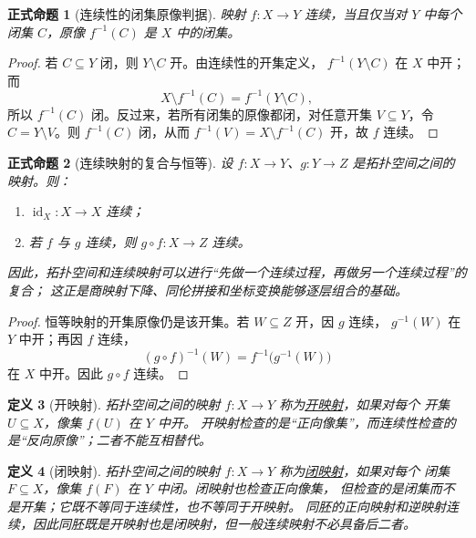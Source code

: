 \documentclass[UTF8,fontset=none,a4paper,11pt]{ctexart}
\theoremstyle{foundation-definition}
\newtheorem{definition}{定义}[section]
\theoremstyle{foundation-theorem}
\theoremstyle{foundation-proposition}
\newtheorem{proposition}[definition]{正式命题}
\theoremstyle{foundation-example}
\theoremstyle{foundation-remark}
\theoremstyle{foundation-theorem}
\newcommand{\term}[2]{\hyperref[#1]{#2}}
\begin{document}
\begin{proposition}[连续性的闭集原像判据]
\label{prop:continuous-closed-preimage}
映射 \(f:X\to Y\) 连续，当且仅当对 \(Y\) 中每个闭集 \(C\)，原像
\(f^{-1}(C)\) 是 \(X\) 中的闭集。
\end{proposition}

\begin{proof}
若 \(C\subseteq Y\) 闭，则 \(Y\setminus C\) 开。由连续性的开集定义，
\(f^{-1}(Y\setminus C)\) 在 \(X\) 中开；而
\[
X\setminus f^{-1}(C)=f^{-1}(Y\setminus C),
\]
所以 \(f^{-1}(C)\) 闭。反过来，若所有闭集的原像都闭，对任意开集
\(V\subseteq Y\)，令 \(C=Y\setminus V\)。则 \(f^{-1}(C)\) 闭，从而
\(f^{-1}(V)=X\setminus f^{-1}(C)\) 开，故 \(f\) 连续。
\end{proof}

\begin{proposition}[连续映射的复合与恒等]\label{prop:continuous-composition}
设 \(f:X\to Y\)、\(g:Y\to Z\) 是拓扑空间之间的映射。则：
\begin{enumerate}[label=(\alph*)]
  \item \(\operatorname{id}_X:X\to X\) 连续；
  \item 若 \(f\) 与 \(g\) 连续，则 \(g\circ f:X\to Z\) 连续。
\end{enumerate}
因此，拓扑空间和连续映射可以进行“先做一个连续过程，再做另一个连续过程”的复合；
这正是商映射下降、同伦拼接和坐标变换能够逐层组合的基础。
\end{proposition}

\begin{proof}
恒等映射的开集原像仍是该开集。若 \(W\subseteq Z\) 开，因 \(g\) 连续，
\(g^{-1}(W)\) 在 \(Y\) 中开；再因 \(f\) 连续，
\[
  (g\circ f)^{-1}(W)=f^{-1}\bigl(g^{-1}(W)\bigr)
\]
在 \(X\) 中开。因此 \(g\circ f\) 连续。
\end{proof}

\begin{definition}[开映射]\label{def:open-map}
拓扑空间之间的映射 \(f:X\to Y\) 称为\term{def:open-map}{开映射}，如果对每个
开集 \(U\subseteq X\)，像集 \(f(U)\) 在 \(Y\) 中开。
开映射检查的是“正向像集”，而连续性检查的是“反向原像”；二者不能互相替代。
\end{definition}

\begin{definition}[闭映射]\label{def:closed-map}
拓扑空间之间的映射 \(f:X\to Y\) 称为\term{def:closed-map}{闭映射}，如果对每个
闭集 \(F\subseteq X\)，像集 \(f(F)\) 在 \(Y\) 中闭。闭映射也检查正向像集，
但检查的是闭集而不是开集；它既不等同于连续性，也不等同于开映射。
同胚的正向映射和逆映射连续，因此同胚既是开映射也是闭映射，但一般连续映射不必具备后二者。
\end{definition}
\end{document}
